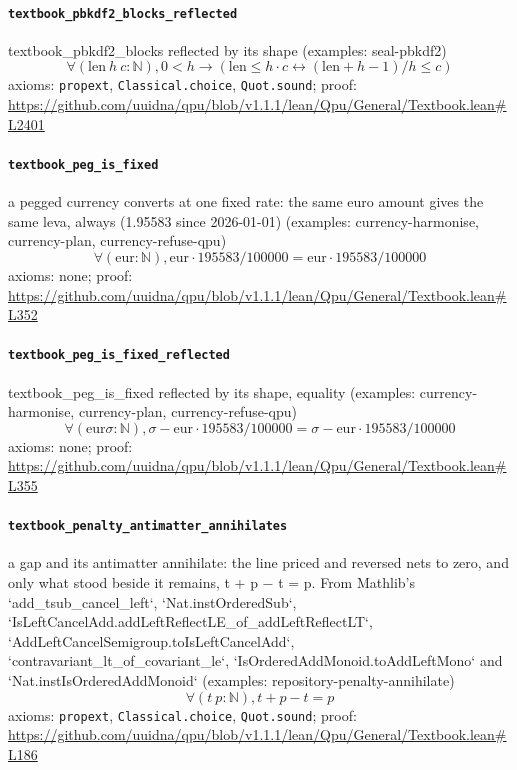 \documentclass[11pt]{article}
\begin{document}
\paragraph{\texttt{textbook\_pbkdf2\_blocks\_reflected}}
textbook\_pbkdf2\_blocks reflected by its shape (examples: seal-pbkdf2)
\[ \forall (\mathrm{len}\ h\ c : \mathbb{N}), 0 < h \to (\mathrm{len} \le h \cdot c \leftrightarrow (\mathrm{len} + h - 1) / h \le c) \]
\noindent axioms: \texttt{propext}, \texttt{Classical.choice}, \texttt{Quot.sound}; proof: \url{https://github.com/uuidna/qpu/blob/v1.1.1/lean/Qpu/General/Textbook.lean\#L2401}

\paragraph{\texttt{textbook\_peg\_is\_fixed}}
a pegged currency converts at one fixed rate: the same euro amount gives the same leva, always (1.95583 since 2026-01-01) (examples: currency-harmonise, currency-plan, currency-refuse-qpu)
\[ \forall (\mathrm{eur} : \mathbb{N}), \mathrm{eur} \cdot 195583 / 100000 = \mathrm{eur} \cdot 195583 / 100000 \]
\noindent axioms: none; proof: \url{https://github.com/uuidna/qpu/blob/v1.1.1/lean/Qpu/General/Textbook.lean\#L352}

\paragraph{\texttt{textbook\_peg\_is\_fixed\_reflected}}
textbook\_peg\_is\_fixed reflected by its shape, equality (examples: currency-harmonise, currency-plan, currency-refuse-qpu)
\[ \forall (\mathrm{eur} \sigma : \mathbb{N}), \sigma - \mathrm{eur} \cdot 195583 / 100000 = \sigma - \mathrm{eur} \cdot 195583 / 100000 \]
\noindent axioms: none; proof: \url{https://github.com/uuidna/qpu/blob/v1.1.1/lean/Qpu/General/Textbook.lean\#L355}

\paragraph{\texttt{textbook\_penalty\_antimatter\_annihilates}}
a gap and its antimatter annihilate: the line priced and reversed nets to zero, and only what stood beside it remains, t + p − t = p. From Mathlib's `add\_tsub\_cancel\_left`, `Nat.instOrderedSub`, `IsLeftCancelAdd.addLeftReflectLE\_of\_addLeftReflectLT`, `AddLeftCancelSemigroup.toIsLeftCancelAdd`, `contravariant\_lt\_of\_covariant\_le`, `IsOrderedAddMonoid.toAddLeftMono` and `Nat.instIsOrderedAddMonoid` (examples: repository-penalty-annihilate)
\[ \forall (t\ p : \mathbb{N}), t + p - t = p \]
\noindent axioms: \texttt{propext}, \texttt{Classical.choice}, \texttt{Quot.sound}; proof: \url{https://github.com/uuidna/qpu/blob/v1.1.1/lean/Qpu/General/Textbook.lean\#L186}
\end{document}
